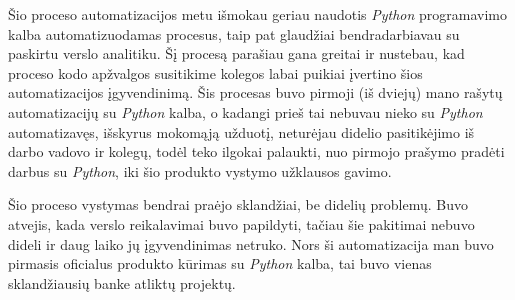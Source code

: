 \documentclass{VUMIFPSBakPrakAt}
\begin{document}
\vspace{10pt}
\par
Šio proceso automatizacijos metu išmokau geriau naudotis \textit{Python} programavimo kalba automatizuodamas procesus, taip pat glaudžiai bendradarbiavau su paskirtu verslo analitiku. Šį procesą parašiau gana greitai ir nustebau, kad proceso kodo apžvalgos susitikime kolegos labai puikiai įvertino šios automatizacijos įgyvendinimą. Šis procesas buvo pirmoji (iš dviejų) mano rašytų automatizacijų su \textit{Python} kalba, o kadangi prieš tai nebuvau nieko su \textit{Python} automatizavęs, išskyrus mokomąją užduotį, neturėjau didelio pasitikėjimo iš darbo vadovo ir kolegų, todėl teko ilgokai palaukti, nuo pirmojo prašymo pradėti darbus su \textit{Python}, iki šio produkto vystymo užklausos gavimo.
\par
Šio proceso vystymas bendrai praėjo sklandžiai, be didelių problemų. Buvo atvejis, kada verslo reikalavimai buvo papildyti, tačiau šie pakitimai nebuvo dideli ir daug laiko jų įgyvendinimas netruko. Nors ši automatizacija man buvo pirmasis oficialus produkto kūrimas su \textit{Python} kalba, tai buvo vienas sklandžiausių banke atliktų projektų.


\begin{comment}
Rezultatai, išvados ir pasiūlymai. Išdėstomi pagrindiniai darbo rezultatai ir išvados, praktikos
darbo privalumai ir trūkumai, aprašomos įgytos žinios ir patirtis praktikos metu, duodamas
universitete įgytų žinių atitikimo praktikos užduočiai atlikti įvertinimas, pateikiami argumentuoti
pasiūlymai, kaip geriau organizuoti darbo ir valdymo procesus praktikos atlikimo vietoje ir
mokymą Universitete (1--2 psl.).
\end{comment}
\end{document}

